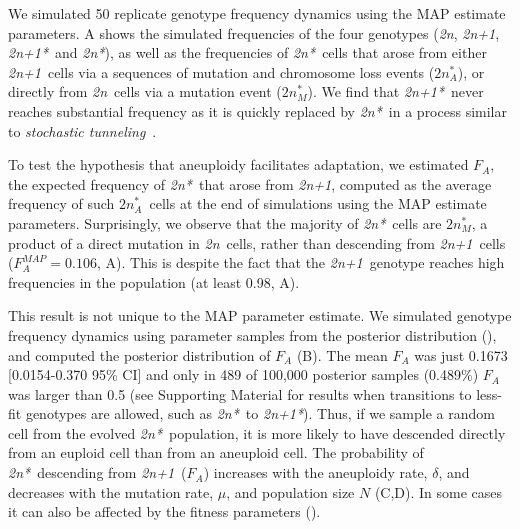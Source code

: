 \documentclass[12pt]{extarticle}
\newcommand{\euwt}{\emph{2n}}
\newcommand{\anwt}{\emph{2n+1}}
\newcommand{\eumt}{\emph{2n*}}
\newcommand{\eumtM}{\emph{$2n^*_M$}}
\newcommand{\eumtA}{\emph{$2n^*_A$}}
\newcommand{\anmt}{\emph{2n+1*}}
\begin{document}
We simulated 50 replicate genotype frequency dynamics using the MAP estimate parameters. 
A shows the simulated frequencies of the four genotypes (\euwt, \anwt, \anmt\ and \eumt), as well as the frequencies of \eumt\ cells that arose from either \anwt\ cells via a sequences of mutation and chromosome loss events ($2n^*_A$), or directly from \euwt\ cells via a mutation event (\eumtM).
We find that \anmt\ never reaches substantial frequency as it is quickly replaced by \eumt\ in a process similar to \emph{stochastic tunneling}~\citep{Iwasa2004,Komarova2003}.

To test the hypothesis that aneuploidy facilitates adaptation, we estimated $F_A$, the expected frequency of \eumt\ that arose from \anwt, computed as the average frequency of such \eumtA\ cells at the end of simulations using the MAP estimate parameters.
Surprisingly, we observe that the majority of \eumt\ cells are \eumtM, a product of a direct mutation in \euwt\ cells, rather than descending from \anwt\ cells ($F_A^{MAP} = 0.106$, A). 
This is despite the fact that the \anwt\ genotype reaches high frequencies in the population (at least 0.98, A).

This result is not unique to the MAP parameter estimate. 
We simulated genotype frequency dynamics using parameter samples from the posterior distribution (), and computed the posterior distribution of $F_A$ (B). 
The mean $F_A$ was just 0.1673 [0.0154-0.370 95\% CI] and only in 489 of 100,000 posterior samples (0.489\%) $F_A$ was  larger than 0.5 (see Supporting Material for results when transitions to less-fit genotypes are allowed, such as \eumt\ to \anmt).  
Thus, if we sample a random cell from the evolved \eumt\ population, it is more likely to have descended directly from an euploid cell than from an aneuploid cell.
The probability of \eumt\ descending from \anwt\ ($F_A$) increases with the aneuploidy rate, $\delta$, and decreases with the mutation rate, $\mu$, and population size $N$ (C,D). In some cases it can also be affected by the fitness parameters ().


\end{document}
